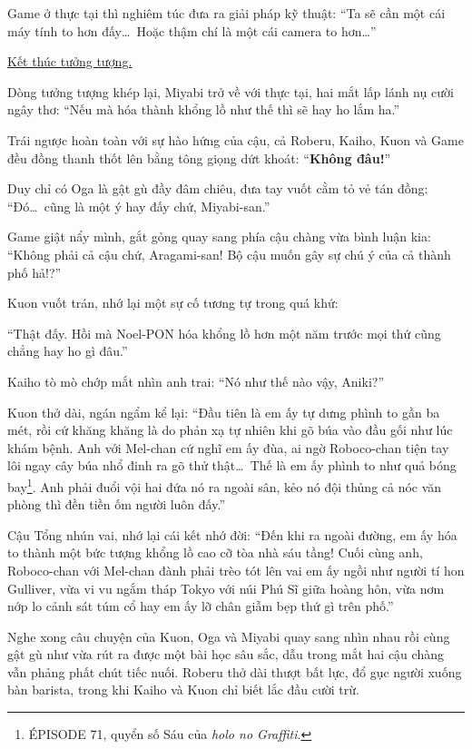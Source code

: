 \documentclass[../main.tex]{subfiles}
\begin{document}
Game ở thực tại thì nghiêm túc đưa ra giải pháp kỹ thuật: ``Ta sẽ cần một cái máy tính to hơn đấy\dots\ Hoặc thậm chí là một cái camera to hơn\dots''

\begin{center}
  \uline{Kết thúc tưởng tượng.}
\end{center}

Dòng tưởng tượng khép lại, Miyabi trở về với thực tại, hai mắt lấp lánh nụ cười ngây thơ: ``Nếu mà hóa thành khổng lồ như thế thì sẽ hay ho lắm ha.''

Trái ngược hoàn toàn với sự hào hứng của cậu, cả Roberu, Kaiho, Kuon và Game đều đồng thanh thốt lên bằng tông giọng dứt khoát: ``\textbf{Không đâu!}''

Duy chỉ có Oga là gật gù đầy đâm chiêu, đưa tay vuốt cằm tỏ vẻ tán đồng: ``Đó\dots\ cũng là một ý hay đấy chứ, Miyabi-san.''

Game giật nẩy mình, gắt gỏng quay sang phía cậu chàng vừa bình luận kia: ``Không phải cả cậu chứ, Aragami-san! Bộ cậu muốn gây sự chú ý của cả thành phố hả!?''

Kuon vuốt trán, nhớ lại một sự cố tương tự trong quá khứ:

``Thật đấy. Hồi mà Noel-PON hóa khổng lồ hơn một năm trước mọi thứ cũng chẳng hay ho gì đâu.''

Kaiho tò mò chớp mắt nhìn anh trai: ``Nó như thế nào vậy, Aniki?''

Kuon thở dài, ngán ngẩm kể lại: ``Đầu tiên là em ấy tự dưng phình to gần ba mét, rồi cứ khăng khăng là do phản xạ tự nhiên khi gõ búa vào đầu gối như lúc khám bệnh. Anh với Mel-chan cứ nghĩ em ấy đùa, ai ngờ Roboco-chan tiện tay lôi ngay cây búa nhổ đinh ra gõ thử thật\dots\ Thế là em ấy phình to như quả bóng bay\footnote{{\flaregothic ÉPISODE 71}, quyển số Sáu của \textit{holo no Graffiti}.}. Anh phải đuổi vội hai đứa nó ra ngoài sân, kẻo nó đội thủng cả nóc văn phòng thì đền tiền ốm người luôn đấy.''

Cậu Tổng nhún vai, nhớ lại cái kết nhớ đời: ``Đến khi ra ngoài đường, em ấy hóa to thành một bức tượng khổng lồ cao cỡ tòa nhà sáu tầng! Cuối cùng anh, Roboco-chan với Mel-chan đành phải trèo tót lên vai em ấy ngồi như người tí hon Gulliver, vừa vi vu ngắm tháp Tokyo với núi Phú Sĩ giữa hoàng hôn, vừa nơm nớp lo cảnh sát túm cổ hay em ấy lỡ chân giẫm bẹp thứ gì trên phố.''

Nghe xong câu chuyện của Kuon, Oga và Miyabi quay sang nhìn nhau rồi cùng gật gù như vừa rút ra được một bài học sâu sắc, dẫu trong mắt hai cậu chàng vẫn phảng phất chút tiếc nuối. Roberu thở dài thượt bất lực, đổ gục người xuống bàn barista, trong khi Kaiho và Kuon chỉ biết lắc đầu cười trừ.
\end{document}
